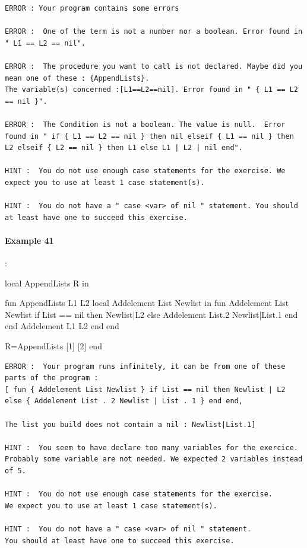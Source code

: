 \documentclass[11pt,a4paper,twoside,openright]{report}
\begin{document}
\begin{lstlisting}
ERROR : Your program contains some errors

ERROR :  One of the term is not a number nor a boolean. Error found in " L1 == L2 == nil".

ERROR :  The procedure you want to call is not declared. Maybe did you mean one of these : {AppendLists}.
The variable(s) concerned :[L1==L2==nil]. Error found in " { L1 == L2 == nil }".

ERROR :  The Condition is not a boolean. The value is null.  Error found in " if { L1 == L2 == nil } then nil elseif { L1 == nil } then L2 elseif { L2 == nil } then L1 else L1 | L2 | nil end".

HINT :  You do not use enough case statements for the exercise. We expect you to use at least 1 case statement(s).

HINT :  You do not have a " case <var> of nil " statement. You should at least have one to succeed this exercise.
\end{lstlisting}

\paragraph{Example 41}:

\begin{OZ}
local AppendLists R in

	fun {AppendLists L1 L2}
		local Addelement List Newlist in
		    fun {Addelement List Newlist}
		        if List == nil then Newlist|L2
        			else {Addelement List.2 Newlist|List.1}
        			end
    			end
    			{Addelement  L1 L2}
		end
	end

R={AppendLists [1] [2]}
end
\end{OZ}

\begin{lstlisting}
ERROR :  Your program runs infinitely, it can be from one of these parts of the program : 
[ fun { Addelement List Newlist } if List == nil then Newlist | L2 else { Addelement List . 2 Newlist | List . 1 } end end, 

The list you build does not contain a nil : Newlist|List.1]

HINT :  You seem to have declare too many variables for the exercice. 
Probably some variable are not needed. We expected 2 variables instead of 5.

HINT :  You do not use enough case statements for the exercise. 
We expect you to use at least 1 case statement(s).

HINT :  You do not have a " case <var> of nil " statement. 
You should at least have one to succeed this exercise.


\end{lstlisting}
\end{document}
